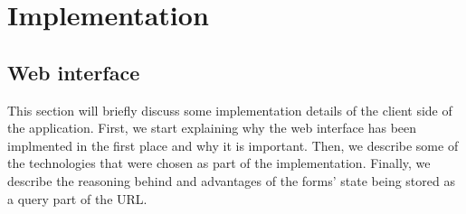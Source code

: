 \chapter{Implementation}
\label{chapter:implementation}







\section{Web interface}

This section will briefly discuss some implementation details of
the client side of the application. First, we start explaining why
the web interface has been implmented in the first place and why it
is important. Then, we describe some of the technologies that were
chosen as part of the implementation. Finally, we describe the
reasoning behind and advantages of the forms' state being stored
as a query part of the URL.

